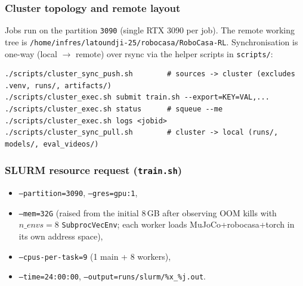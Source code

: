 \documentclass[11pt]{article}
\begin{document}
\subsubsection*{Cluster topology and remote layout}
Jobs run on the partition \texttt{3090} (single RTX 3090 per job). The remote
working tree is \texttt{/home/infres/latoundji-25/robocasa/RoboCasa-RL}.
Synchronisation is one-way (local $\to$ remote) over rsync via the helper
scripts in \texttt{scripts/}:
\begin{lstlisting}
./scripts/cluster_sync_push.sh        # sources -> cluster (excludes .venv, runs/, artifacts/)
./scripts/cluster_exec.sh submit train.sh --export=KEY=VAL,...
./scripts/cluster_exec.sh status      # squeue --me
./scripts/cluster_exec.sh logs <jobid>
./scripts/cluster_sync_pull.sh        # cluster -> local (runs/, models/, eval_videos/)
\end{lstlisting}

\subsubsection*{SLURM resource request (\texttt{train.sh})}
\begin{itemize}
  \item \texttt{--partition=3090}, \texttt{--gres=gpu:1},
  \item \texttt{--mem=32G} (raised from the initial 8\,GB after observing OOM
    kills with $n\_envs{=}8$ \texttt{SubprocVecEnv}; each worker loads
    MuJoCo+robocasa+torch in its own address space),
  \item \texttt{--cpus-per-task=9} (1 main + 8 workers),
  \item \texttt{--time=24:00:00}, \texttt{--output=runs/slurm/\%x\_\%j.out}.
\end{itemize}
\end{document}
